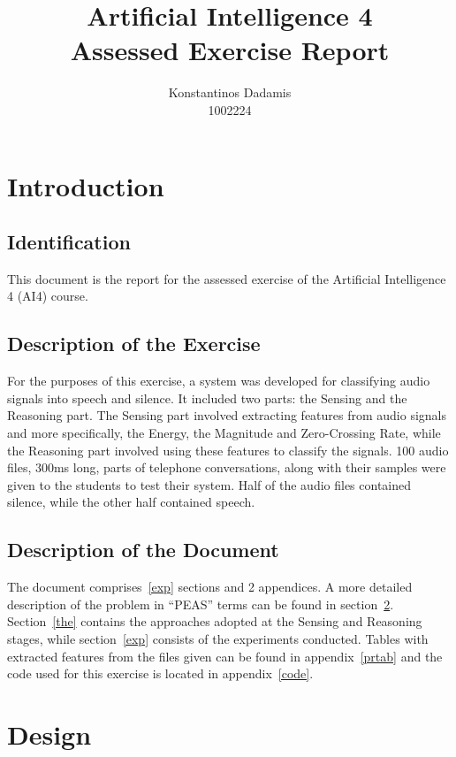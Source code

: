 \documentclass{article}
\author{Konstantinos Dadamis \\ 1002224}
\title{Artificial Intelligence 4 \\ Assessed Exercise Report}
\begin{document}
\maketitle

\section{Introduction}
\label{intro}

\subsection{Identification}
This document is the report for the assessed exercise of the Artificial Intelligence 4 (AI4) course. 

\subsection{Description of the Exercise}
\label{intro:descr}

For the purposes of this exercise, a system was developed for classifying audio signals into speech and silence. 
It included two parts: the Sensing and the Reasoning part. 
The Sensing part involved extracting features from audio signals and more specifically, the Energy, the Magnitude and Zero-Crossing Rate, while the Reasoning part involved using these features to classify the signals.
100 audio files, 300ms long, parts of telephone conversations, along with their samples were given to the students to test their system. 
Half of the audio files contained silence, while the other half contained speech.

\subsection{Description of the Document}

The document comprises~\ref{exp} sections and 2 appendices. 
A more detailed description of the problem in ``PEAS'' terms can be found in section~\ref{des}.
Section~\ref{the} contains the approaches adopted at the Sensing and Reasoning stages, while section~\ref{exp} consists of the experiments conducted.
Tables with extracted features from the files given can be found in appendix~\ref{prtab} and the code used for this exercise is located in appendix~\ref{code}.

\section{Design}
\label{des}
\end{document}
